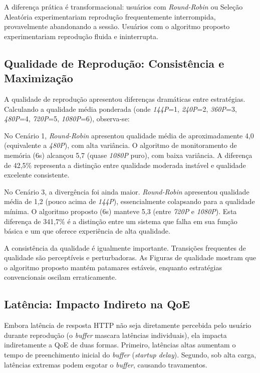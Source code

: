 A diferença prática é transformacional: usuários com \textit{Round-Robin} ou Seleção Aleatória experimentariam reprodução frequentemente interrompida, provavelmente abandonando a sessão. Usuários com o algoritmo proposto experimentariam reprodução fluida e ininterrupta.

\subsection{Qualidade de Reprodução: Consistência e Maximização}

A qualidade de reprodução apresentou diferenças dramáticas entre estratégias. Calculando a qualidade média ponderada (onde \textit{144P}=1, \textit{240P}=2, \textit{360P}=3, \textit{480P}=4, \textit{720P}=5, \textit{1080P}=6), observa-se:

No Cenário 1, \textit{Round-Robin} apresentou qualidade média de aproximadamente 4,0 (equivalente a \textit{480P}), com alta variância. O algoritmo de monitoramento de memória (6s) alcançou 5,7 (quase \textit{1080P} puro), com baixa variância. A diferença de 42,5\% representa a distinção entre qualidade moderada instável e qualidade excelente consistente.

No Cenário 3, a divergência foi ainda maior. \textit{Round-Robin} apresentou qualidade média de 1,2 (pouco acima de \textit{144P}), essencialmente colapsando para a qualidade mínima. O algoritmo proposto (6s) manteve 5,3 (entre \textit{720P} e \textit{1080P}). Esta diferença de 341,7\% é a distinção entre um sistema que falha em sua função básica e um que oferece experiência de alta qualidade.

A consistência da qualidade é igualmente importante. Transições frequentes de qualidade são perceptíveis e perturbadoras. As Figuras de qualidade mostram que o algoritmo proposto mantém patamares estáveis, enquanto estratégias convencionais oscilam erraticamente.

\subsection{Latência: Impacto Indireto na QoE}

Embora latência de resposta HTTP não seja diretamente percebida pelo usuário durante reprodução (o \textit{buffer} mascara latências individuais), ela impacta indiretamente a QoE de duas formas. Primeiro, latências altas aumentam o tempo de preenchimento inicial do \textit{buffer} (\textit{startup delay}). Segundo, sob alta carga, latências extremas podem esgotar o \textit{buffer}, causando travamentos.

